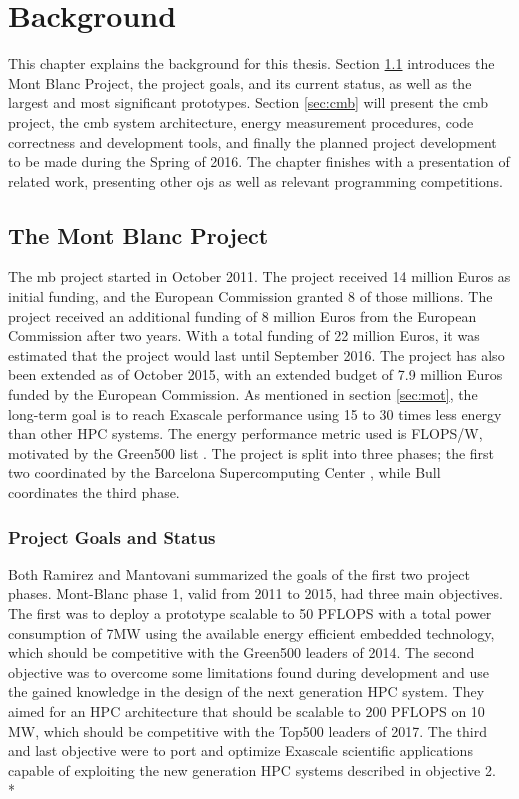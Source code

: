 \chapter{Background}
\label{ch:background}
This chapter explains the background for this thesis. Section \ref{sec:mbp} introduces the Mont Blanc Project, the project goals, and its current status, as well as the largest and most significant prototypes. Section \ref{sec:cmb} will present the \gls{cmb} project, the \gls{cmb} system architecture, energy measurement procedures, code correctness and development tools, and finally the planned project development to be made during the Spring of 2016. The chapter finishes with a presentation of related work, presenting other \gls{ojs} as well as relevant programming competitions.

\section{The Mont Blanc Project}
\label{sec:mbp}
The \gls{mb} project \cite{MB} started in October 2011. The project received 14 million Euros as initial funding, and the European Commission granted 8 of those millions. The project received an additional funding of 8 million Euros from the European Commission after two years. With a total funding of 22 million Euros, it was estimated that the project would last until September 2016. The project has also been extended as of October 2015, with an extended budget of 7.9 million Euros funded by the European Commission. As mentioned in section \ref{sec:mot}, the long-term goal is to reach Exascale performance using 15 to 30 times less energy than other HPC systems. The energy performance metric used is FLOPS/W, motivated by the Green500 list \cite{GREEN500}. The project is split into three phases; the first two coordinated by the Barcelona Supercomputing Center \cite{BSC}, while Bull \cite{BULL} coordinates the third phase.

\subsection{Project Goals and Status}
Both Ramirez \cite{p:MB-PRACE-14} and Mantovani \cite{p:MB-15} summarized the goals of the first two project phases. Mont-Blanc phase 1, valid from 2011 to 2015, had three main objectives. The first was to deploy a prototype scalable to 50 PFLOPS with a total power consumption of 7MW using the available energy efficient embedded technology, which should be competitive with the Green500 leaders of 2014. The second objective was to overcome some limitations found during development and use the gained knowledge in the design of the next generation HPC system. They aimed for an HPC architecture that should be scalable to 200 PFLOPS on 10 MW, which should be competitive with the Top500 leaders of 2017. The third and last objective were to port and optimize Exascale scientific applications capable of exploiting the new generation HPC systems described in objective 2. \\*

